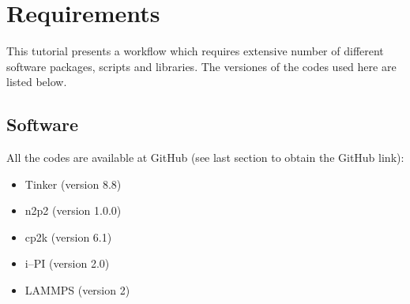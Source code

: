 \documentclass[12pt]{article}
\begin{document}
%


%

\newpage
%

\section{Requirements}
This tutorial presents a workflow which requires extensive number of different software packages, scripts and libraries. The versiones of the codes used here are listed below.

\subsection{Software}
All the codes are available at GitHub (see last section to obtain the GitHub link):
\begin{itemize}
    \item Tinker (version 8.8)
    \item n2p2 (version 1.0.0)
    \item cp2k (version 6.1)
    \item i--PI (version 2.0)
    \item LAMMPS (version 2)
\end{itemize}
%
\end{document}
